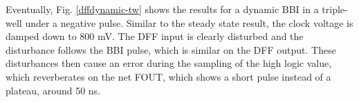 		
		Eventually, Fig. \ref{dffdynamic-tw} shows the results for a dynamic BBI in a triple-well under a negative pulse.
		Similar to the steady state result, the clock voltage is damped down to 800 mV.
		The DFF input is clearly disturbed and the disturbance follows the BBI pulse, which is similar on the DFF output.
		These disturbances then cause an error during the sampling of the high logic value, which reverberates on the net FOUT, which shows a short pulse instead of a plateau, around 50 ns.
		

%
%	
%

